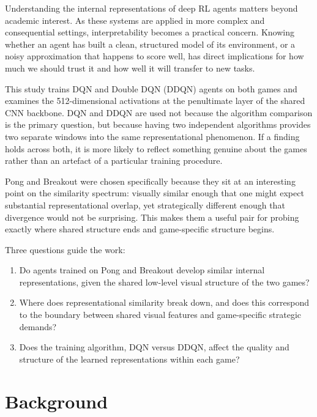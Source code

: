 \documentclass[a4paper]{article}
\begin{document}
Understanding the internal representations of deep RL agents matters beyond academic interest. As these systems are applied in more complex and consequential settings, interpretability becomes a practical concern. Knowing whether an agent has built a clean, structured model of its environment, or a noisy approximation that happens to score well, has direct implications for how much we should trust it and how well it will transfer to new tasks.

This study trains DQN \cite{mnih2015human} and Double DQN (DDQN) \cite{van2016deep} agents on both games and examines the 512-dimensional activations at the penultimate layer of the shared CNN backbone. DQN and DDQN are used not because the algorithm comparison is the primary question, but because having two independent algorithms provides two separate windows into the same representational phenomenon. If a finding holds across both, it is more likely to reflect something genuine about the games rather than an artefact of a particular training procedure.

Pong and Breakout were chosen specifically because they sit at an interesting point on the similarity spectrum: visually similar enough that one might expect substantial representational overlap, yet strategically different enough that divergence would not be surprising. This makes them a useful pair for probing exactly where shared structure ends and game-specific structure begins.

Three questions guide the work:
\begin{enumerate}
    \item Do agents trained on Pong and Breakout develop similar internal representations, given the shared low-level visual structure of the two games?
    \item Where does representational similarity break down, and does this correspond to the boundary between shared visual features and game-specific strategic demands?
    \item Does the training algorithm, DQN versus DDQN, affect the quality and structure of the learned representations within each game?
\end{enumerate}

\section{Background}
\label{sec:background}
\end{document}
